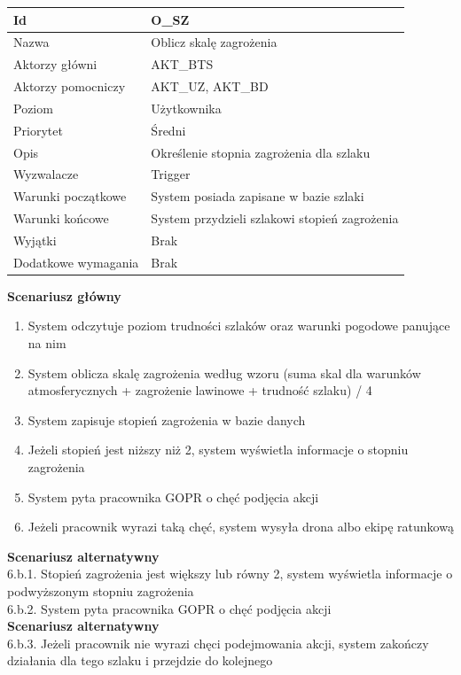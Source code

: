 \documentclass[a4paper,12pt]{article}
\begin{document}
\begin{longtable}{| p{5cm} | p{10cm} |}
\hline
Id & O\_SZ \\\hline
Nazwa & Oblicz skalę zagrożenia \\\hline
Aktorzy główni & AKT\_BTS \\\hline
Aktorzy pomocniczy & AKT\_UZ, AKT\_BD \\\hline
Poziom & Użytkownika \\\hline
Priorytet & Średni \\\hline
Opis & Określenie stopnia zagrożenia dla szlaku \\\hline
Wyzwalacze & Trigger \\\hline
Warunki początkowe & System posiada zapisane w bazie szlaki \\\hline
Warunki końcowe & System przydzieli szlakowi stopień zagrożenia \\\hline
Wyjątki & Brak \\\hline
Dodatkowe wymagania & Brak \\\hline
\end{longtable}
\textbf{Scenariusz główny}
\begin{enumerate}
\item System odczytuje poziom trudności szlaków oraz warunki pogodowe panujące na nim
\item System oblicza skalę zagrożenia według wzoru (suma skal dla warunków atmosferycznych + zagrożenie lawinowe + trudność szlaku) / 4
\item System zapisuje stopień zagrożenia w bazie danych
\item Jeżeli stopień jest niższy niż 2, system wyświetla informacje o stopniu zagrożenia
\item System pyta pracownika GOPR o chęć podjęcia akcji
\item Jeżeli pracownik wyrazi taką chęć, system wysyła drona albo ekipę ratunkową
\end{enumerate}
\textbf{Scenariusz alternatywny}\\
6.b.1. Stopień zagrożenia jest większy lub równy 2, system wyświetla informacje o podwyższonym stopniu zagrożenia\\
6.b.2. System pyta pracownika GOPR o chęć podjęcia akcji\\
\textbf{Scenariusz alternatywny}\\
6.b.3.	Jeżeli pracownik nie wyrazi chęci podejmowania akcji, system zakończy działania dla tego szlaku i przejdzie do kolejnego
\end{document}
